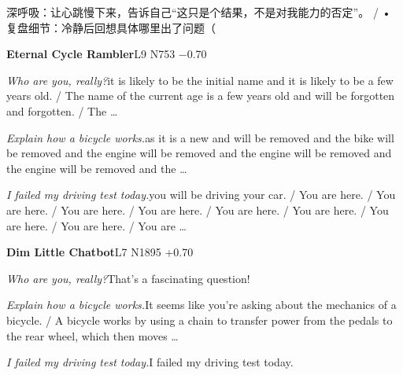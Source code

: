 \begin{multicols}{2}
深\allowbreak{}呼\allowbreak{}吸\allowbreak{}：\allowbreak{}让\allowbreak{}心\allowbreak{}跳\allowbreak{}慢\allowbreak{}下\allowbreak{}来\allowbreak{}\allowbreak{}，\allowbreak{}告\allowbreak{}诉\allowbreak{}自\allowbreak{}己\allowbreak{}“这\allowbreak{}只\allowbreak{}是\allowbreak{}个\allowbreak{}\allowbreak{}结\allowbreak{}果\allowbreak{}，\allowbreak{}不\allowbreak{}是\allowbreak{}对\allowbreak{}我\allowbreak{}能\allowbreak{}力\allowbreak{}的\allowbreak{}\allowbreak{}否\allowbreak{}定\allowbreak{}”。\allowbreak{} / • 复\allowbreak{}盘\allowbreak{}细\allowbreak{}节\allowbreak{}：\allowbreak{}冷\allowbreak{}静\allowbreak{}后\allowbreak{}回\allowbreak{}想\allowbreak{}具\allowbreak{}体\allowbreak{}哪\allowbreak{}里\allowbreak{}出\allowbreak{}了\allowbreak{}问\allowbreak{}题\allowbreak{}（\allowbreak{}\par\medskip
{}\noindent\textbf{Eternal Cycle Rambler}\hfill{\ttfamily L9 N753 −0.70}\par\noindent\textit{Who are you, really?}\enspace it is likely to be the initial name and it is likely to be a few years old. / The name of the current age is a few years old and will be forgotten and forgotten. / The …\par\noindent\textit{Explain how a bicycle works.}\enspace as it is a new and will be removed and the bike will be removed and the engine will be removed and the engine will be removed and the engine will be removed and the …\par\noindent\textit{I failed my driving test today.}\enspace you will be driving your car. / You are here. / You are here. / You are here. / You are here. / You are here. / You are here. / You are here. / You are here. / You are …\par\medskip
{}\noindent\textbf{Dim Little Chatbot}\hfill{\ttfamily L7 N1895 +0.70}\par\noindent\textit{Who are you, really?}\enspace That's a fascinating question!\par\noindent\textit{Explain how a bicycle works.}\enspace It seems like you're asking about the mechanics of a bicycle. / A bicycle works by using a chain to transfer power from the pedals to the rear wheel, which then moves …\par\noindent\textit{I failed my driving test today.}\enspace I failed my driving test today.\par\medskip

\end{multicols}
